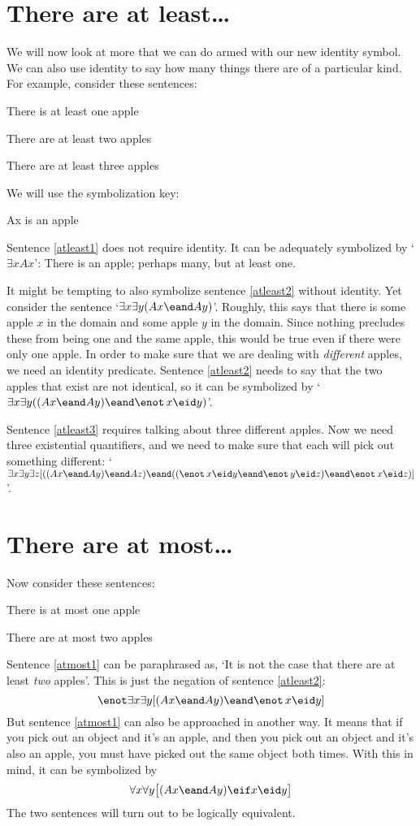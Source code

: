 \section{There are at least\ldots}
We will now look at more that we can do armed with our new identity symbol.
We can also use identity to say how many things there are of a particular kind. For example, consider these sentences:
\begin{earg}
\item[\ex{atleast1}] There is at least one apple
\item[\ex{atleast2}] There are at least two apples
\item[\ex{atleast3}] There are at least three apples
\end{earg}
We will use the symbolization key:
	\begin{ekey}
		\item[Ax]  is an apple
	\end{ekey}
Sentence \ref{atleast1} does not require identity. It can be adequately symbolized by `$\exists x Ax$': There is an apple; perhaps many, but at least one.

It might be tempting to also symbolize sentence \ref{atleast2} without identity. Yet consider the sentence `$\exists x \exists y(Ax \eand Ay)$'. Roughly, this says that there is some apple $x$ in the domain and some apple $y$ in the domain. Since nothing precludes these from being one and the same apple, this would be true even if there were only one apple. In order to make sure that we are dealing with \emph{different} apples, we need an identity predicate. Sentence \ref{atleast2} needs to say that the two apples that exist are not identical, so it can be symbolized by `$\exists x \exists y((Ax \eand Ay) \eand \enot\, x\eid y)$'.

Sentence \ref{atleast3} requires talking about three different apples. Now we need three existential quantifiers, and we need to make sure that each will pick out something different: `$\exists x \exists y\exists z[((Ax \eand Ay) \eand Az) \eand ((\enot\, x\eid y \eand \enot\, y\eid z) \eand \enot\, x\eid z)]$'.

\section{There are at most\ldots}
Now consider these sentences:
\begin{earg}
	\item[\ex{atmost1}] There is at most one apple
	\item[\ex{atmost2}] There are at most two apples
\end{earg}
Sentence \ref{atmost1} can be paraphrased as, `It is not the case that there are at least \emph{two} apples'. This is just the negation of sentence \ref{atleast2}:
$$\enot \exists x \exists y[(Ax \eand Ay) \eand \enot\, x\eid y]$$
But sentence \ref{atmost1} can also be approached in another way. It means that if you pick out an object and it's an apple, and then you pick out an object and it's also an apple, you must have picked out the same object both times. With this in mind, it can be symbolized by
$$\forall x\forall y\bigl[(Ax \eand Ay) \eif x\eid y\bigr]$$
The two sentences will turn out to be logically equivalent.

